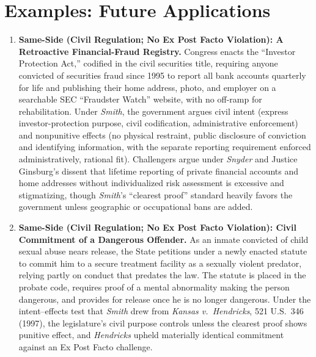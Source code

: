 \documentclass[12pt]{article}
\begin{document}
\section{Examples: Future Applications}
\begin{enumerate}

\item \textbf{Same-Side (Civil Regulation; No Ex Post Facto Violation): A Retroactive Financial-Fraud Registry.} Congress enacts the ``Investor Protection Act,'' codified in the civil securities title, requiring anyone convicted of securities fraud since 1995 to report all bank accounts quarterly for life and publishing their home address, photo, and employer on a searchable SEC ``Fraudster Watch'' website, with no off-ramp for rehabilitation. Under \textit{Smith}, the government argues civil intent (express investor-protection purpose, civil codification, administrative enforcement) and nonpunitive effects (no physical restraint, public disclosure of conviction and identifying information, with the separate reporting requirement enforced administratively, rational fit). Challengers argue under \textit{Snyder} and Justice Ginsburg's dissent that lifetime reporting of private financial accounts and home addresses without individualized risk assessment is excessive and stigmatizing, though \textit{Smith}'s ``clearest proof'' standard heavily favors the government unless geographic or occupational bans are added.

\item \textbf{Same-Side (Civil Regulation; No Ex Post Facto Violation): Civil Commitment of a Dangerous Offender.} As an inmate convicted of child sexual abuse nears release, the State petitions under a newly enacted statute to commit him to a secure treatment facility as a sexually violent predator, relying partly on conduct that predates the law. The statute is placed in the probate code, requires proof of a mental abnormality making the person dangerous, and provides for release once he is no longer dangerous. Under the intent--effects test that \textit{Smith} drew from \textit{Kansas v.\ Hendricks}, 521 U.S.\ 346 (1997), the legislature's civil purpose controls unless the clearest proof shows punitive effect, and \textit{Hendricks} upheld materially identical commitment against an Ex Post Facto challenge.


\end{enumerate}
\end{document}
